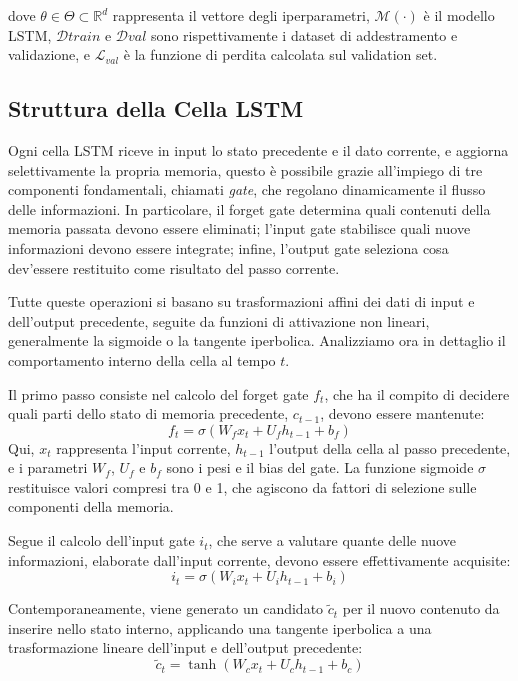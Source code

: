 \documentclass{article}
\begin{document}
dove $\theta \in \Theta \subset \mathbb{R}^d$ rappresenta il vettore degli iperparametri, $\mathcal{M}(\cdot)$ è il 
modello LSTM, $\mathcal{D}{train}$ e $\mathcal{D}{val}$ sono rispettivamente i dataset di addestramento e 
validazione, e $\mathcal{L}_{val}$ è la funzione di perdita calcolata sul validation set.

\subsection{Struttura della Cella LSTM}

Ogni cella LSTM riceve in input lo stato precedente e il dato corrente, e aggiorna selettivamente 
la propria memoria, questo è possibile grazie all’impiego di tre componenti fondamentali, chiamati 
\textit{gate}, che regolano dinamicamente il flusso delle informazioni. In particolare, il forget 
gate determina quali contenuti della memoria passata devono essere eliminati; l’input gate stabilisce 
quali nuove informazioni devono essere integrate; infine, l’output gate seleziona cosa dev’essere 
restituito come risultato del passo corrente.

Tutte queste operazioni si basano su trasformazioni affini dei dati di input e dell’output precedente, 
seguite da funzioni di attivazione non lineari, generalmente la sigmoide o la tangente iperbolica. 
Analizziamo ora in dettaglio il comportamento interno della cella al tempo $t$.

Il primo passo consiste nel calcolo del forget gate $f_t$, che ha il compito di decidere quali parti 
dello stato di memoria precedente, $c_{t-1}$, devono essere mantenute:
\begin{equation}
f_t = \sigma(W_f x_t + U_f h_{t-1} + b_f)
\end{equation}
Qui, $x_t$ rappresenta l’input corrente, $h_{t-1}$ l’output della cella al passo precedente, e i 
parametri $W_f$, $U_f$ e $b_f$ sono i pesi e il bias del gate. La funzione sigmoide $\sigma$ restituisce 
valori compresi tra 0 e 1, che agiscono da fattori di selezione sulle componenti della memoria.

Segue il calcolo dell’input gate $i_t$, che serve a valutare quante delle nuove informazioni, elaborate 
dall’input corrente, devono essere effettivamente acquisite:
\begin{equation}
i_t = \sigma(W_i x_t + U_i h_{t-1} + b_i)
\end{equation}

Contemporaneamente, viene generato un candidato $\tilde{c}_t$ per il nuovo contenuto da inserire nello 
stato interno, applicando una tangente iperbolica a una trasformazione lineare dell’input e dell’output 
precedente:
\begin{equation}
\tilde{c}_t = \tanh(W_c x_t + U_c h_{t-1} + b_c)
\end{equation}
\end{document}
